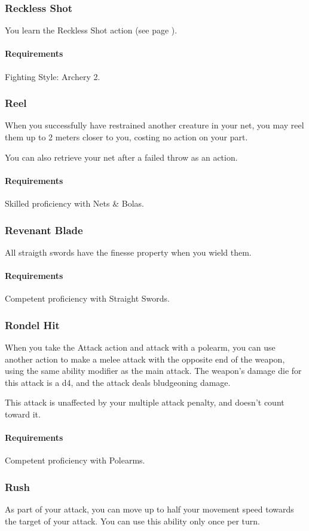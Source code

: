 \subsubsection{Reckless Shot} \label{feat::recklessshot}
    You learn the Reckless Shot action (see page \pageref{act::recklessshot}).
    \paragraph{Requirements} Fighting Style: Archery 2.
\subsubsection{Reel} \label{feat::reel}
    When you successfully have restrained another creature in your net, you may reel them up to 2 meters closer to you, costing no action on your part.

    You can also retrieve your net after a failed throw as an action.
    \paragraph{Requirements} Skilled proficiency with Nets \& Bolas.
\subsubsection{Revenant Blade} \label{feat::revenantblade}
    All straigth swords have the finesse property when you wield them.
    \paragraph{Requirements} Competent proficiency with Straight Swords.
\subsubsection{Rondel Hit} \label{feat::rondelhit}
    When you take the Attack action and attack with a polearm, you can use another action to make a melee attack with the opposite end of the weapon, using the same ability modifier as the main attack.
    The weapon's damage die for this attack is a d4, and the attack deals bludgeoning damage.

    This attack is unaffected by your multiple attack penalty, and doesn't count toward it.
    \paragraph{Requirements} Competent proficiency with Polearms.
\subsubsection{Rush} \label{feat::rush}
    As part of your attack, you can move up to half your movement speed towards the target of your attack.
    You can use this ability only once per turn.
